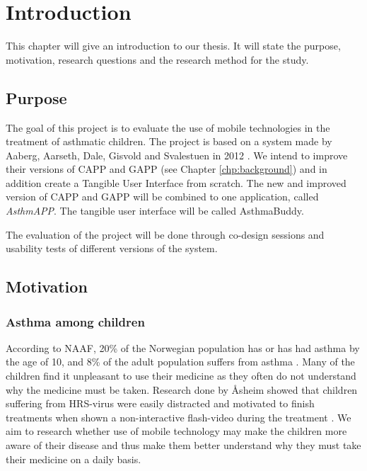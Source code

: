 \chapter{Introduction}
\label{chp:introduction}

This chapter will give an introduction to our thesis. It will state the purpose, motivation, research questions and the research method for the study. 

\section{Purpose}
\label{sec:purpose}
The goal of this project is to evaluate the use of mobile technologies in the treatment of asthmatic children. The project is based on a system made by Aaberg, Aarseth, Dale, Gisvold and Svalestuen in 2012 \cite{CustomerDriven}. We intend to improve their versions of CAPP and GAPP (see Chapter \ref{chp:background}) and in addition create a Tangible User Interface from scratch. The new and improved version of CAPP and GAPP will be combined to one application, called \emph{AsthmAPP}. The tangible user interface will be called AsthmaBuddy.

The evaluation of the project will be done through co-design sessions and usability tests of different versions of the system. 
 



\section{Motivation}
\label{sec:motivation}

\subsection{Asthma among children}
According to NAAF, 20\% of the Norwegian population has or has had asthma by the age of 10, and 8\% of the adult population suffers from asthma \cite{NAAF}. Many of the children find it unpleasant to use their medicine as they often do not understand why the medicine must be taken. Research done by \r{A}sheim showed that children suffering from HRS-virus were easily distracted and motivated to finish treatments when shown a non-interactive flash-video during the treatment \cite{Asheim610877}. We aim to research whether use of mobile technology may make the children more aware of their disease and thus make them better understand why they must take their medicine on a daily basis. 


